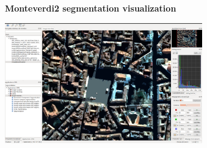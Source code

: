 \documentclass[portrait,a0]{a0poster}
\newenvironment{poster}{
  \begin{center}
  \begin{minipage}[c]{0.99\textwidth}
}{
  \end{minipage} 
  \end{center}
}
\newcommand{\titresubsection}[1]{ 
 	\begin{center}
 	\Large{\textbf{#1}}
 	\end{center}
 }
\begin{document}
\begin{poster}
\begin{minipage}[t]{\textwidth}
\begin{minipage}[t]{0.33\textwidth}
\begin{minipage}[t]{\textwidth}
\titresubsection{Monteverdi2 segmentation visualization}
\begin{center}
\includegraphics[width=0.64\textwidth]{Pictures/monteverdi2-segmentation.png}
\end{center}
\end{minipage}

\end{minipage}
\end{minipage}








\end{poster}
\end{document}
